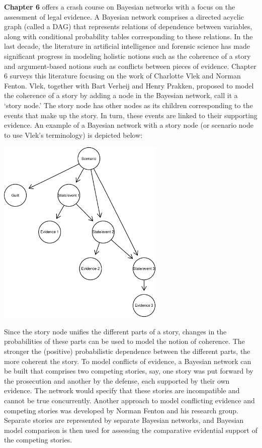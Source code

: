 \documentclass[
  10pt,
  dvipsnames,enabledeprecatedfontcommands]{scrartcl}
\begin{document}
\textbf{Chapter 6} offers a crash course on Bayesian networks with a
focus on the assessment of legal evidence. A Bayesian network comprises
a directed acyclic graph (called a DAG) that represents relations of
dependence between variables, along with conditional probability tables
corresponding to these relations. In the last decade, the literature in
artificial intelligence and forensic science has made significant
progress in modeling holistic notions such as the coherence of a story
and argument-based notions such as conflicts between pieces of evidence.
Chapter 6 surveys this literature focusing on the work of Charlotte Vlek
and Norman Fenton. Vlek, together with Bart Verheij and Henry Prakken,
proposed to model the coherence of a story by adding a node in the
Bayesian network, call it a `story node.' The story node has other nodes
as its children corresponding to the events that make up the story. In
turn, these events are linked to their supporting evidence. An example
of a Bayesian network with a story node (or scenario node to use Vlek's
terminology) is depicted below:

\begin{center}
\includegraphics[width=8cm]{vlek-scenario-node.pdf}
 \end{center}

Since the story node unifies the different parts of a story, changes in
the probabilities of these parts can be used to model the notion of
coherence. The stronger the (positive) probabilistic dependence between
the different parts, the more coherent the story. To model conflicts of
evidence, a Bayesian network can be built that comprises two competing
stories, say, one story was put forward by the prosecution and another
by the defense, each supported by their own evidence. The network would
specify that these stories are incompatible and cannot be true
concurrently. Another approach to model conflicting evidence and
competing stories was developed by Norman Fenton and his research group.
Separate stories are represented by separate Bayesian networks, and
Bayesian model comparison is then used for assessing the comparative
evidential support of the competing stories.
\end{document}
